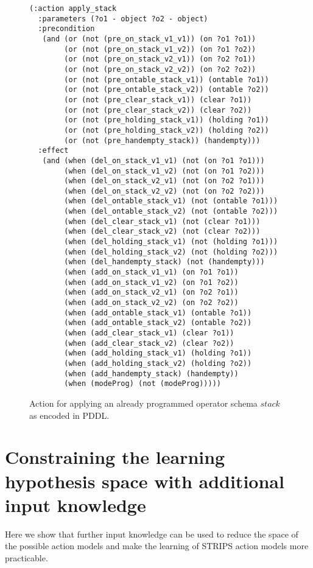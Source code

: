 \documentclass[letterpaper]{article} %
\begin{document}
\begin{figure}[hbt]
\begin{scriptsize}
\begin{verbatim}
(:action apply_stack
  :parameters (?o1 - object ?o2 - object)
  :precondition
   (and (or (not (pre_on_stack_v1_v1)) (on ?o1 ?o1))
        (or (not (pre_on_stack_v1_v2)) (on ?o1 ?o2))
        (or (not (pre_on_stack_v2_v1)) (on ?o2 ?o1))
        (or (not (pre_on_stack_v2_v2)) (on ?o2 ?o2))
        (or (not (pre_ontable_stack_v1)) (ontable ?o1))
        (or (not (pre_ontable_stack_v2)) (ontable ?o2))
        (or (not (pre_clear_stack_v1)) (clear ?o1))
        (or (not (pre_clear_stack_v2)) (clear ?o2))
        (or (not (pre_holding_stack_v1)) (holding ?o1))
        (or (not (pre_holding_stack_v2)) (holding ?o2))
        (or (not (pre_handempty_stack)) (handempty)))
  :effect
   (and (when (del_on_stack_v1_v1) (not (on ?o1 ?o1)))
        (when (del_on_stack_v1_v2) (not (on ?o1 ?o2)))
        (when (del_on_stack_v2_v1) (not (on ?o2 ?o1)))
        (when (del_on_stack_v2_v2) (not (on ?o2 ?o2)))
        (when (del_ontable_stack_v1) (not (ontable ?o1)))
        (when (del_ontable_stack_v2) (not (ontable ?o2)))
        (when (del_clear_stack_v1) (not (clear ?o1)))
        (when (del_clear_stack_v2) (not (clear ?o2)))
        (when (del_holding_stack_v1) (not (holding ?o1)))
        (when (del_holding_stack_v2) (not (holding ?o2)))
        (when (del_handempty_stack) (not (handempty)))
        (when (add_on_stack_v1_v1) (on ?o1 ?o1))
        (when (add_on_stack_v1_v2) (on ?o1 ?o2))
        (when (add_on_stack_v2_v1) (on ?o2 ?o1))
        (when (add_on_stack_v2_v2) (on ?o2 ?o2))
        (when (add_ontable_stack_v1) (ontable ?o1))
        (when (add_ontable_stack_v2) (ontable ?o2))
        (when (add_clear_stack_v1) (clear ?o1))
        (when (add_clear_stack_v2) (clear ?o2))
        (when (add_holding_stack_v1) (holding ?o1))
        (when (add_holding_stack_v2) (holding ?o2))
        (when (add_handempty_stack) (handempty))
        (when (modeProg) (not (modeProg)))))
\end{verbatim}
\end{scriptsize}
 \caption{\small Action for applying an already programmed operator schema $stack$ as encoded in PDDL.}
\label{fig:compilation}
\end{figure}


\section{Constraining the learning hypothesis space with additional input knowledge}
Here we show that further input knowledge can be used to reduce the space of the possible action models and make the learning of STRIPS action models more practicable. 
\end{document}
